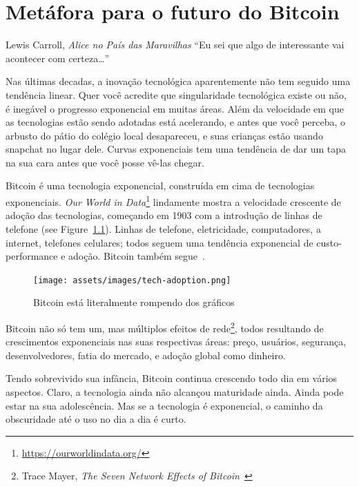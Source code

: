 \chapter{Metáfora para o futuro do Bitcoin}
\label{les:21}

\begin{chapquote}{Lewis Carroll, \textit{Alice no País das Maravilhas}}
\enquote{Eu sei que algo de interessante vai acontecer com certeza\ldots}
\end{chapquote}

Nas últimas decadas, a inovação tecnológica aparentemente não tem seguido 
uma tendência linear. Quer você acredite que singularidade tecnológica existe 
ou não, é inegável o progresso exponencial em muitas áreas. Além da velocidade 
em que as tecnologias estão sendo adotadas está acelerando, e antes 
que você perceba, o arbusto do pátio do colégio local desapareceu, e suas 
crianças estão usando snapchat no lugar dele. Curvas exponenciais tem uma 
tendência de dar um tapa na sua cara antes que você posse vê-las chegar.

Bitcoin é uma tecnologia exponencial, construída em cima de tecnologias exponenciais.
\textit{Our World in Data}\footnote{\url{https://ourworldindata.org/}}
lindamente mostra a velocidade crescente de adoção das tecnologias, começando em 1903
com a introdução de linhas de telefone (see Figure~\ref{fig:tech-adoption}).
Linhas de telefone, eletricidade, computadores, a internet, telefones celulares; 
todos seguem uma tendência exponencial de custo-performance e adoção. 
Bitcoin também segue~\cite{tech-adoption}.

\begin{figure}
  \texttt{[image: assets/images/tech-adoption.png]}
  \caption{Bitcoin está literalmente rompendo dos gráficos}
  \label{fig:tech-adoption}
\end{figure}

Bitcoin não só tem um, mas múltiplos efeitos de rede\footnote{Trace Mayer,
	\textit{The Seven Network Effects of Bitcoin}~\cite{7-network-effects}}, todos
resultando de crescimentos exponenciais nas suas respectivas áreas: preço, usuários, 
segurança, desenvolvedores, fatia do mercado, e adoção global como dinheiro.

Tendo sobrevivido sua infância, Bitcoin continua crescendo todo dia em vários aspectos.
Claro, a tecnologia ainda não alcançou maturidade ainda. Ainda pode estar na sua 
adolescência. Mas se a tecnologia é exponencial, o caminho da obscuridade até 
o uso no dia a dia é curto. 

